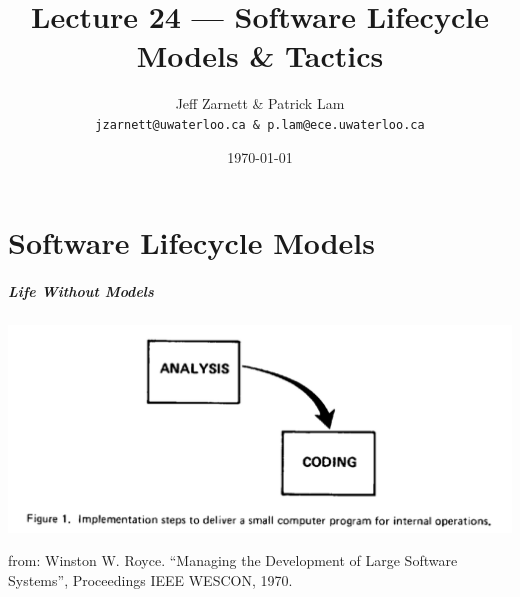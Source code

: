 

\title{Lecture 24 --- Software Lifecycle Models \& Tactics}

\author{Jeff Zarnett \& Patrick Lam \\ \small \texttt{jzarnett@uwaterloo.ca \& p.lam@ece.uwaterloo.ca}}
\date{\today}



\begin{frame}
  \titlepage
\end{frame}

\part{Software Lifecycle Models}
\frame{\partpage}

\begin{frame}
\frametitle{Life Without Models}

\begin{center}
\includegraphics[height=.5\textheight]{images/two-stages.png}
\end{center}

from: Winston W. Royce. ``Managing the Development of Large Software Systems'', Proceedings IEEE WESCON, 1970.

\end{frame}

